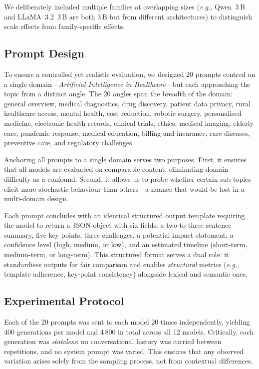 \documentclass[11pt,a4paper]{article}
\newcommand{\eg}{\textit{e.g.}}
\begin{document}
We deliberately included multiple families at overlapping sizes (\eg, Qwen~3\,B and LLaMA~3.2~3\,B are both 3\,B but from different architectures) to distinguish scale effects from family-specific effects.

\subsection{Prompt Design}
\label{sec:prompts}

To ensure a controlled yet realistic evaluation, we designed 20 prompts centred on a single domain---\emph{Artificial Intelligence in Healthcare}---but each approaching the topic from a distinct angle.
The 20 angles span the breadth of the domain: general overview, medical diagnostics, drug discovery, patient data privacy, rural healthcare access, mental health, cost reduction, robotic surgery, personalised medicine, electronic health records, clinical trials, ethics, medical imaging, elderly care, pandemic response, medical education, billing and insurance, rare diseases, preventive care, and regulatory challenges.

Anchoring all prompts to a single domain serves two purposes.
First, it ensures that all models are evaluated on comparable content, eliminating domain difficulty as a confound.
Second, it allows us to probe whether certain sub-topics elicit more stochastic behaviour than others---a nuance that would be lost in a multi-domain design.

Each prompt concludes with an identical structured output template requiring the model to return a JSON object with six fields: a two-to-three sentence summary, five key points, three challenges, a potential impact statement, a confidence level (high, medium, or low), and an estimated timeline (short-term, medium-term, or long-term).
This structured format serves a dual role: it standardises outputs for fair comparison and enables \emph{structural} metrics (\eg, template adherence, key-point consistency) alongside lexical and semantic ones.

\subsection{Experimental Protocol}
\label{sec:protocol}

Each of the 20 prompts was sent to each model 20 times independently, yielding 400 generations per model and 4\,800 in total across all 12 models.
Critically, each generation was \emph{stateless}: no conversational history was carried between repetitions, and no system prompt was varied.
This ensures that any observed variation arises solely from the sampling process, not from contextual differences.
\end{document}
